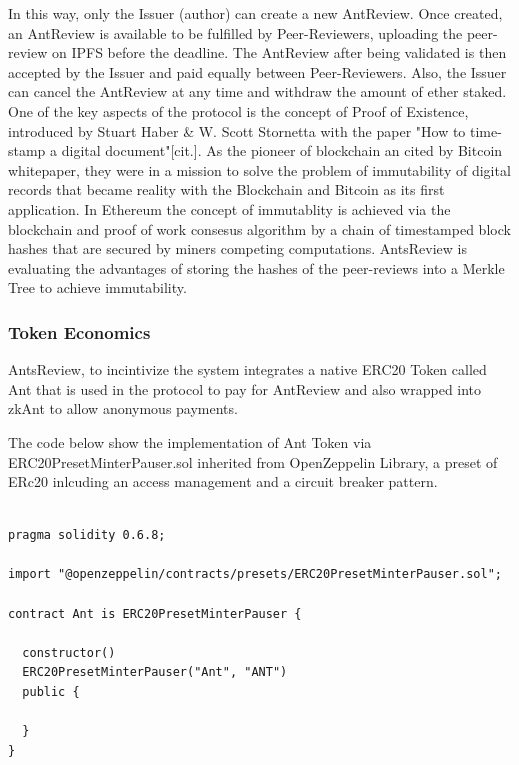 \documentclass[runningheads]{llncs}
\begin{document}
In this way, only the Issuer (author) can create a new AntReview.
\newline Once created, an AntReview is available to be fulfilled by Peer-Reviewers, uploading the peer-review on IPFS before the deadline.
\newline The AntReview after being validated is then accepted by the Issuer and paid equally between Peer-Reviewers.
\newline Also, the Issuer can cancel the AntReview at any time and withdraw the amount of ether staked.
\newline One of the key aspects of the protocol is the concept of Proof of Existence, introduced by Stuart Haber & W. Scott Stornetta with the paper "How to time-stamp a digital document"[cit.].
\newline As the pioneer of blockchain an cited by Bitcoin whitepaper, they were in a mission to solve the problem of immutability of digital records that became reality with the Blockchain and Bitcoin as its first application.
\newline In Ethereum the concept of immutablity is achieved via the blockchain and proof of work consesus algorithm by a chain of timestamped block hashes that are secured by miners competing computations.
\newline AntsReview is evaluating the advantages of storing the hashes of the peer-reviews into a Merkle Tree to achieve immutability.

\subsubsection{Token Economics}
AntsReview, to incintivize the system integrates a native ERC20 Token called Ant that is used in the protocol to pay for AntReview and also wrapped into zkAnt to allow anonymous payments.

The code below show the implementation of Ant Token via ERC20PresetMinterPauser.sol inherited from OpenZeppelin Library, a preset of ERc20 inlcuding an access management and a circuit breaker pattern.

\begin{lstlisting}[language=Solidity]

pragma solidity 0.6.8;

import "@openzeppelin/contracts/presets/ERC20PresetMinterPauser.sol";

contract Ant is ERC20PresetMinterPauser {

  constructor()
  ERC20PresetMinterPauser("Ant", "ANT")
  public {

  }
}
\end{lstlisting}
\end{document}
